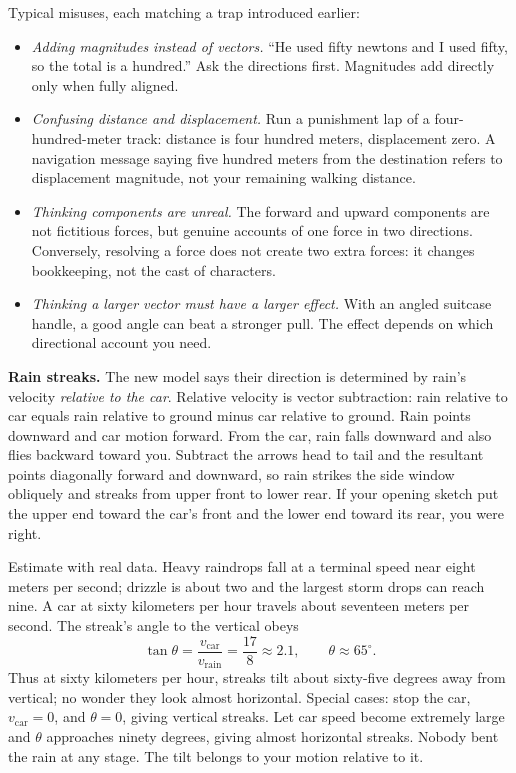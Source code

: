 Typical misuses, each matching a trap introduced earlier:

\begin{itemize}[leftmargin=1.8em]
  \item \emph{Adding magnitudes instead of vectors.} ``He used fifty newtons and I used fifty, so the total is a hundred.'' Ask the directions first. Magnitudes add directly only when fully aligned.
  \item \emph{Confusing distance and displacement.} Run a punishment lap of a four-hundred-meter track: distance is four hundred meters, displacement zero. A navigation message saying five hundred meters from the destination refers to displacement magnitude, not your remaining walking distance.
  \item \emph{Thinking components are unreal.} The forward and upward components are not fictitious forces, but genuine accounts of one force in two directions. Conversely, resolving a force does not create two extra forces: it changes bookkeeping, not the cast of characters.
  \item \emph{Thinking a larger vector must have a larger effect.} With an angled suitcase handle, a good angle can beat a stronger pull. The effect depends on which directional account you need.
\end{itemize}


\textbf{Rain streaks.} The new model says their direction is determined by rain's velocity \emph{relative to the car}. Relative velocity is vector subtraction: rain relative to car equals rain relative to ground minus car relative to ground. Rain points downward and car motion forward. From the car, rain falls downward and also flies backward toward you. Subtract the arrows head to tail and the resultant points diagonally forward and downward, so rain strikes the side window obliquely and streaks from upper front to lower rear. If your opening sketch put the upper end toward the car's front and the lower end toward its rear, you were right.

Estimate with real data. Heavy raindrops fall at a terminal speed near eight meters per second; drizzle is about two and the largest storm drops can reach nine. A car at sixty kilometers per hour travels about seventeen meters per second. The streak's angle to the vertical obeys
\[
  \tan\theta=\frac{v_{\text{car}}}{v_{\text{rain}}}=\frac{17}{8}\approx 2.1,
  \qquad \theta\approx 65^{\circ} .
\]
Thus at sixty kilometers per hour, streaks tilt about sixty-five degrees away from vertical; no wonder they look almost horizontal. Special cases: stop the car, \(v_{\text{car}}=0\), and \(\theta=0\), giving vertical streaks. Let car speed become extremely large and \(\theta\) approaches ninety degrees, giving almost horizontal streaks. Nobody bent the rain at any stage. The tilt belongs to your motion relative to it.


